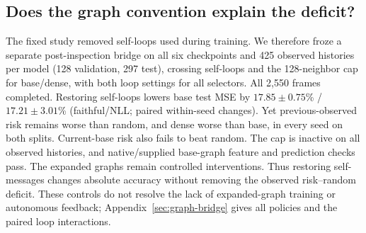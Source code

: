 \subsection{Does the graph convention explain the deficit?}
The fixed study removed self-loops used during training. We therefore froze a
separate post-inspection bridge on all six checkpoints and 425 observed
histories per model (128 validation, 297 test), crossing self-loops and the
128-neighbor cap for base/dense, with both loop settings for all selectors.
All 2,550 frames completed. Restoring self-loops lowers base test MSE by
$17.85\pm0.75$\% / $17.21\pm3.01$\%
(faithful/NLL; paired within-seed changes).
Yet previous-observed risk remains worse than random, and dense worse than base,
in every seed on both splits. Current-base risk also fails to beat random.
The cap is inactive on all observed histories, and native/supplied
base-graph feature and prediction checks pass. The expanded graphs remain
controlled interventions. Thus restoring self-messages changes absolute
accuracy without removing the observed risk--random deficit. These controls
do not resolve the lack of expanded-graph training or autonomous feedback;
Appendix~\ref{sec:graph-bridge} gives all policies and the paired loop
interactions.
